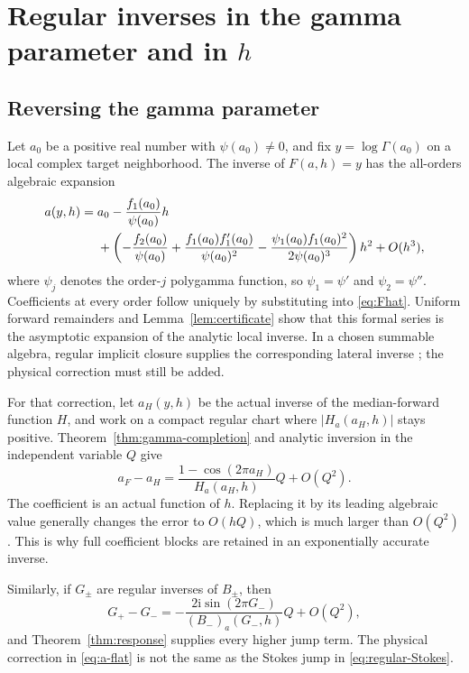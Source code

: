 \documentclass[11pt,a4paper]{article}
\numberwithin{equation}{section}
\theoremstyle{definition}
\theoremstyle{remark}\newtheorem{remark}[theorem]{Remark}
\newcommand{\ii}{\mathrm i}\newcommand{\e}{\mathrm e}
\begin{document}
\section{Regular inverses in the gamma parameter and in \texorpdfstring{$h$}{h}}
\label{sec:applications-regular}

\subsection{Reversing the gamma parameter}
Let $a_0$ be a positive real number with $\psi(a_0)\ne0$, and fix
$y=\log\Gamma(a_0)$ on a local complex target neighborhood. The inverse
of $F(a,h)=y$ has the all-orders algebraic expansion
\begin{align}
 a(y,h)={}&a_0-\frac{f_1(a_0)}{\psi(a_0)}h\notag\\
 &+\left(-\frac{f_2(a_0)}{\psi(a_0)}
       +\frac{f_1(a_0)f_1'(a_0)}{\psi(a_0)^2}
       -\frac{\psi_1(a_0)f_1(a_0)^2}{2\psi(a_0)^3}\right)h^2
       +O(h^3),\label{eq:a-inverse}
\end{align}
where $\psi_j$ denotes the order-$j$ polygamma function, so
$\psi_1=\psi'$ and $\psi_2=\psi''$. Coefficients at every order follow
uniquely by substituting into \eqref{eq:Fhat}. Uniform forward
remainders and Lemma~\ref{lem:certificate} show that this formal series
is the asymptotic expansion of the analytic local inverse. In a chosen
summable algebra, regular implicit closure supplies the corresponding
lateral inverse \cite{sauzin}; the physical correction must still be added.

For that correction, let $a_H(y,h)$ be the actual inverse of the
median-forward function $H$, and work on a compact regular chart where
$|H_a(a_H,h)|$ stays positive. Theorem~\ref{thm:gamma-completion} and
analytic inversion in the independent variable $Q$ give
\begin{equation}\label{eq:a-flat}
 a_F-a_H=
 \frac{1-\cos(2\pi a_H)}{H_a(a_H,h)}Q+O(Q^2).
\end{equation}
The coefficient is an actual function of $h$. Replacing it by its
leading algebraic value generally changes the error to $O(hQ)$,
which is much larger than $O(Q^2)$. This is why full coefficient blocks
are retained in an exponentially accurate inverse.

Similarly, if $G_\pm$ are regular inverses of $B_\pm$, then
\begin{equation}\label{eq:regular-Stokes}
 G_+-G_-=-\frac{2\ii\sin(2\pi G_-)}{(B_-)_a(G_-,h)}Q+O(Q^2),
\end{equation}
and Theorem~\ref{thm:response} supplies every higher jump term. The
physical correction in \eqref{eq:a-flat} is not the same as the Stokes
jump in \eqref{eq:regular-Stokes}.
\end{document}
